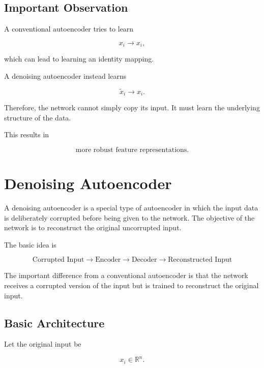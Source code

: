 \documentclass{article}
\begin{document}
\subsection{Important Observation}

A conventional autoencoder tries to learn

\[
x_i\rightarrow x_i,
\]

which can lead to learning an identity mapping.

A denoising autoencoder instead learns

\[
\boxed{
	\widetilde{x}_i\rightarrow x_i.
}
\]

Therefore, the network cannot simply copy its input. It must learn the
underlying structure of the data.

This results in

\[
\boxed{
	\text{more robust feature representations}.
}
\]

\section{Denoising Autoencoder}

A denoising autoencoder is a special type of autoencoder in which the
input data is deliberately corrupted before being given to the
network. The objective of the network is to reconstruct the original
uncorrupted input.

The basic idea is

\[
\boxed{
	\text{Corrupted Input}
	\longrightarrow
	\text{Encoder}
	\longrightarrow
	\text{Decoder}
	\longrightarrow
	\text{Reconstructed Input}
}
\]

The important difference from a conventional autoencoder is that the
network receives a corrupted version of the input but is trained to
reconstruct the original input.

\subsection{Basic Architecture}

Let the original input be

\[
x_i \in \mathbb{R}^{n}.
\]
\end{document}

